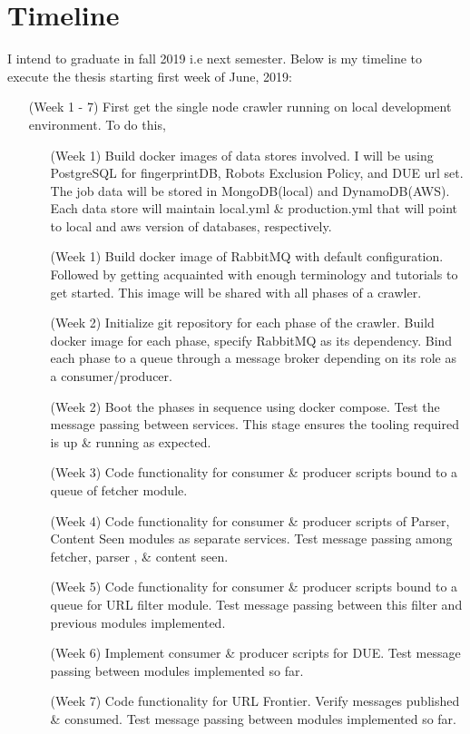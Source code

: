 \chapter{Timeline}
I intend to graduate in fall 2019 i.e next semester. Below is my timeline to execute the thesis starting
first week of June, 2019:
\begin{itemize}
\item[(Week 1 - 7)] First get the single node crawler running on local development environment. To do this,
  \begin{itemize}
  \item[(Week 1)] Build docker images of data stores involved. I will be using PostgreSQL for
    fingerprintDB, Robots Exclusion Policy, and DUE url set. The job data will be stored in MongoDB(local)
    and DynamoDB(AWS). Each data store will maintain local.yml
    \& production.yml that will point to local and aws version of databases, respectively.
  \item[(Week 1)] Build docker image of RabbitMQ with default configuration. Followed by getting acquainted with enough terminology and tutorials to get started. This image will be shared with all phases of a
    crawler.
  \item [(Week 2)]Initialize git repository for each phase of the crawler. Build docker image for each phase,
    specify RabbitMQ as its dependency. Bind each phase to a queue through a message broker depending
    on its role as a consumer/producer.
  \item[(Week 2)] Boot the phases in sequence using docker compose. Test the message passing between services.
    This stage ensures the tooling required is up \& running as expected.
  \item[(Week 3)] Code functionality for consumer \& producer scripts bound to a queue of fetcher module. 
  \item[(Week 4)] Code functionality for consumer \& producer scripts of Parser, Content Seen modules as separate
    services. Test message passing among fetcher, parser , \& content seen.
  \item[(Week 5)] Code functionality for consumer \& producer scripts bound to a queue for URL filter module. Test
    message passing between this filter and previous modules implemented.
  \item[(Week 6)] Implement consumer \& producer scripts for DUE. Test message passing between modules implemented
    so far.
  \item[(Week 7)] Code functionality for URL Frontier. Verify messages published \& consumed. Test message passing between modules implemented so far.

\end{itemize}
\end{itemize}
